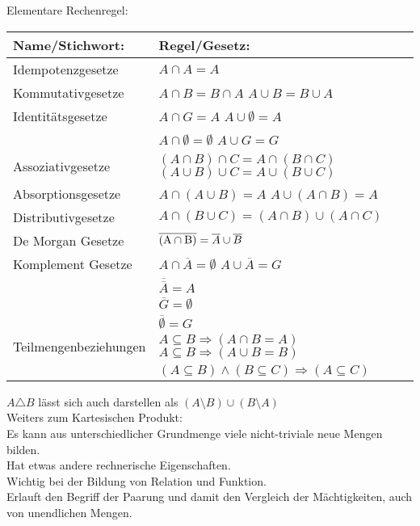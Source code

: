 \documentclass[../gruppenarbeit_1.tex]{subfiles}
\begin{document}
Elementare Rechenregel:\\
\def\arraystretch{1.5}
\begin{table}[ht]
\begin{tabular}[t]{ll}
\hline
Name/Stichwort: & Regel/Gesetz:\\
\hline
  Idempotenzgesetze &
  $A \cap A = A$\\
  Kommutativgesetze &
  $A \cap B = B \cap A$ \hspace{31mm} $A \cup B = B \cup A$\\
  Identitätsgesetze &
  $A \cap G = A$ \hspace{37.5mm} $A \cup \emptyset = A$\\
  &
  $A \cap \emptyset = \emptyset$ \hspace{39mm} $A \cup G = G$\\
  Assoziativgesetze &
  $(A \cap B) \cap C = A \cap (B \cap C)$
  \hspace{11.5mm}
  $(A \cup B) \cup C = A \cup (B \cup C)$\\
  Absorptionsgesetze &
  $A \cap (A \cup B) = A$ \hspace{28mm} $A \cup (A \cap B) = A$\\
  Distributivgesetze &
  $A \cap (B \cup C) = (A \cap B) \cup ( A \cap C)$\\
  De Morgan Gesetze &
  $\overline{\rm (A \cap B)} = \overline{A} \cup \overline{B}$\\
  Komplement Gesetze &
  $A \cap \overline{A} = \emptyset$ \hspace{39mm} $A \cup \overline{A} = G$\\
  &
  $\overline{\overline{A}} = A$\\
  &
  $\overline{G} = \emptyset$\\
  &
  $\overline{\emptyset} = G$\\
  Teilmengenbeziehungen &
  $A \subseteq B \Rightarrow ( A \cap B = A)$ \hspace{20mm} $A \subseteq B \Rightarrow (A \cup B = B)$\\
  &
  $(A \subseteq B) \wedge (B \subseteq C) \Rightarrow (A \subseteq C)$\\
\hline
\end{tabular}
\end{table}

$A \triangle B$ lässt sich auch darstellen als $(A \setminus B) \cup (B \setminus A)$\\

Weiters zum Kartesischen Produkt:\\
Es kann aus unterschiedlicher Grundmenge viele nicht-triviale neue Mengen bilden.\\
Hat etwas andere rechnerische Eigenschaften.\\
Wichtig bei der Bildung von Relation und Funktion.\\
Erlauft den Begriff der Paarung und damit den Vergleich der Mächtigkeiten, auch von unendlichen Mengen.\\
\end{document}
